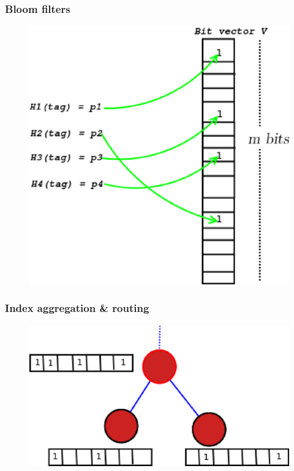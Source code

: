 \documentclass{beamer}
\begin{document}
\begin{frame}[fragile] %
\frametitle{Bloom filters}
\begin{figure}
\includegraphics[scale=0.4]{bloom}
\end{figure}
\end{frame}

\begin{frame}[fragile] %
\frametitle{Index aggregation \& routing}
\begin{figure}
\includegraphics[scale=0.4]{d3}
\end{figure}
\end{frame}
\end{document}

